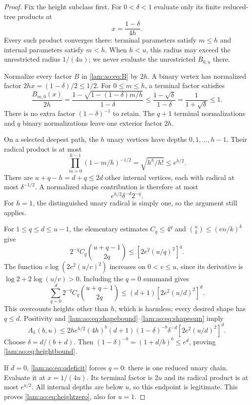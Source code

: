 \documentclass[11pt,a4paper]{article}
\numberwithin{equation}{section}
\theoremstyle{remark}
\begin{document}
\begin{proof}
Fix the height subclass first. For $0<\delta<1$ evaluate only its finite reduced-tree products at
\[
 x=\frac{1-\delta}{4h}.
\]
Every such product converges there: terminal parameters satisfy $m\le h$ and internal parameters satisfy $m<h$. When $h<u$, this radius may exceed the unrestricted radius $1/(4u)$; we never evaluate the unrestricted $B_{0,u}$ there.

Normalize every factor $B$ in \eqref{lam:ao:eq:B} by $2h$. A binary vertex has normalized factor $2hx=(1-\delta)/2\le1/2$. For $0\le m\le h$, a terminal factor satisfies
\begin{equation}\label{lam:ao:eq:terminal}
 \frac{B_{m,0}(x)}{2h}
 =\frac{1-\sqrt{1-(1-\delta)m/h}}{1-\delta}
 \le\frac{1-\sqrt\delta}{1-\delta}
 =\frac1{1+\sqrt\delta}\le1.
\end{equation}
There is no extra factor $(1-\delta)^{-1}$ to retain. The $q+1$ terminal normalizations and $q$ binary normalizations leave one exterior factor $2h$.

On a selected deepest path, the $h$ unary vertices have depths $0,1,\ldots,h-1$. Their radical product is at most
\[
 \prod_{m=0}^{h-1}(1-m/h)^{-1/2}=\sqrt{h^h/h!}\le e^{h/2}.
\]
There are $u+q-h=d+q\le2d$ other internal vertices, each with radical at most $\delta^{-1/2}$. A normalized shape contribution is therefore at most
\begin{equation}\label{lam:ao:eq:shapebound}
 e^{h/2}\delta^{-d}2^{-q}.
\end{equation}
For $h=1$, the distinguished unary radical is simply one, so the argument still applies.

For $1\le q\le d\le u-1$, the elementary estimates $C_q\le4^q$ and $\binom nk\le(en/k)^k$ give
\[
 2^{-q}C_q\binom{u+q-1}{2q}\le[2e^2(u/q)^2]^q.
\]
The function $v\log(2e^2(u/v)^2)$ increases on $0<v\le u$, since its derivative is $\log2+2\log(u/v)>0$. Including the $q=0$ summand gives
\begin{equation}\label{lam:ao:eq:shapesum}
 \sum_{q=0}^{d}2^{-q}C_q\binom{u+q-1}{2q}
       \le(d+1)[2e^2(u/d)^2]^d.
\end{equation}
This overcounts heights other than $h$, which is harmless; every desired shape has $q\le d$. Positivity and \eqref{lam:ao:eq:shapebound}--\eqref{lam:ao:eq:shapesum} imply
\[
 A_h(b,u)\le2h e^{h/2}(4h)^b(d+1)
    (1-\delta)^{-b}\delta^{-d}[2e^2(u/d)^2]^d.
\]
Choose $\delta=d/(b+d)$. Then $(1-\delta)^{-b}=(1+d/b)^b\le e^d$, proving \eqref{lam:ao:eq:heightbound}.

If $d=0$, \eqref{lam:ao:eq:qdeficit} forces $q=0$: there is one reduced unary chain. Evaluate it at $x=1/(4u)$. Its terminal factor is $2u$ and its radical product is at most $e^{u/2}$. All internal depths are below $u$, so this endpoint is legitimate. This proves \eqref{lam:ao:eq:heightzero}, also for $u=1$.
\end{proof}
\end{document}
